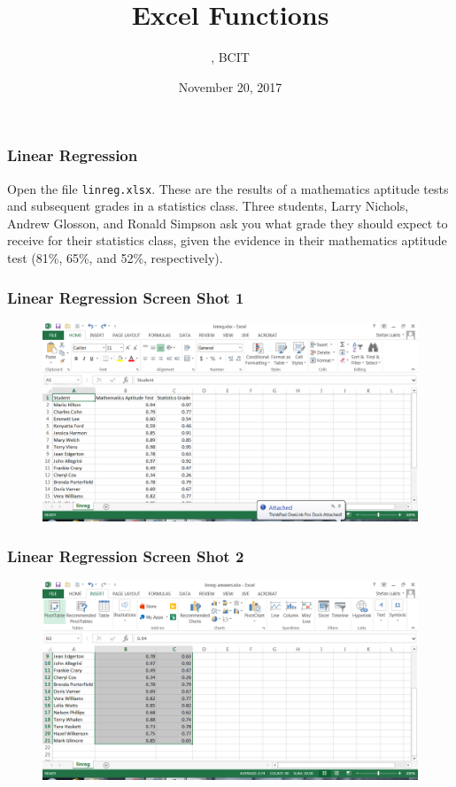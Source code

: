 \documentclass[xcolor=dvipsnames]{beamer}
\title{Excel Functions}
\subtitle{{\CourseNumber}, BCIT}
\author{\CourseName}
\date{November 20, 2017}
\begin{document}
\begin{frame}
  \titlepage
\end{frame}

\begin{frame}
  \frametitle{Linear Regression}
  Open the file \texttt{linreg.xlsx}. These are the results of a mathematics
  aptitude tests and subsequent grades in a statistics class. Three
  students, Larry Nichols, Andrew Glosson, and Ronald Simpson ask you
  what grade they should expect to receive for their statistics class,
  given the evidence in their mathematics aptitude test (81\%, 65\%,
  and 52\%, respectively).
\end{frame}

\begin{frame}
  \frametitle{Linear Regression Screen Shot 1}
  \begin{figure}[h]
    \includegraphics[scale=.42]{./linreg01.png}
  \end{figure}
\end{frame}

\begin{frame}
  \frametitle{Linear Regression Screen Shot 2}
  \begin{figure}[h]
    \includegraphics[scale=.42]{./linreg02.png}
  \end{figure}
\end{frame}
\end{document}
